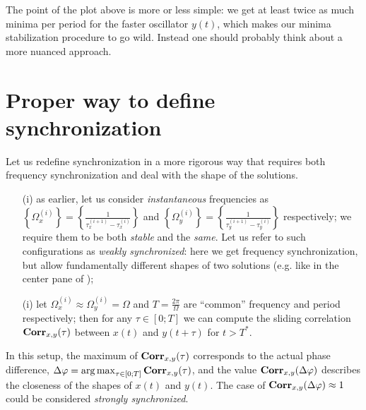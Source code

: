 \documentclass{mynotes}
\begin{document}
The point of the plot above is more or less simple: we get at least twice as much minima per period for the faster oscillator \( y(t) \), which makes our minima stabilization procedure to go wild. Instead one should probably think about a more nuanced approach.     


\section{ Proper way to define synchronization }

Let us redefine synchronization in a more rigorous way that requires both frequency synchronization and deal with the shape of the solutions.

\begin{enumerate}[ topsep = -0.5em, itemsep = -0.25em ]
      \item[\color{rwth-blue}(i)] as earlier, let us consider \textit{instantaneous} frequencies as \( \left\{ \Omega_x^{(i)} \right\} = \left\{ \frac{1}{ \tau_x^{(i+1)} - \tau_x^{(i)} } \right\} \) and \( \left\{ \Omega_y^{(i)} \right\} = \left\{ \frac{1}{ \tau_y^{(i+1)} - \tau_y^{(i)} } \right\} \) respectively; we require them to be both \textit{stable} and the \textit{same}. Let us refer to such configurations as \emph{weakly synchronized}: here we get frequency synchronization, but allow fundamentally different shapes of two solutions (e.g. like in the center pane of );
      \item[\color{rwth-blue}(i)] let \( \Omega_x^{(i)} \approx \Omega_y^{(i)} = \Omega \) and \( T = \frac{2\pi}{\Omega} \) are ``common'' frequency and period respectively; then for any \( \tau \in [0; T ] \) we can compute the sliding correlation  \( \operatorname{\mathbf{Corr}}_{x,y}(\tau) \) between \( x(t) \) and \( y(t+\tau)\) for \( t > T^* \).
\end{enumerate} 

In this setup, the maximum of  \( \operatorname{\mathbf{Corr}}_{x,y}(\tau) \) corresponds to the actual phase difference, \( \Delta\varphi = \operatorname*{arg\,max}_{\tau \in [0; T ]} \operatorname{\mathbf{Corr}}_{x,y}(\tau) \), and the value \( \operatorname{\mathbf{Corr}}_{x,y}(\Delta \varphi ) \) describes the closeness of the shapes of \( x(t )\) and \( y(t) \). The case of \( \operatorname{\mathbf{Corr}}_{x,y}(\Delta \varphi ) \approx 1 \) could be considered \emph{strongly synchronized}. 
\end{document}

